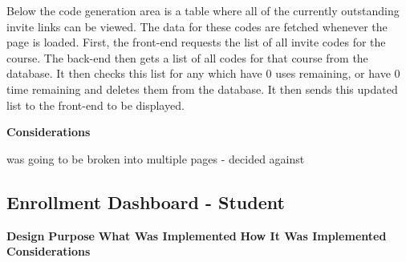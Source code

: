 Below the code generation area is a table where all of the currently outstanding invite links can be viewed. The data for these codes are fetched whenever the page is loaded. First, the front-end requests the list of all invite codes for the course. The back-end then gets a list of all codes for that course from the database. It then checks this list for any which have 0 uses remaining, or have 0 time remaining and deletes them from the database. It then sends this updated list to the front-end to be displayed.

\textbf{Considerations}

was going to be broken into multiple pages - decided against

\subsection{Enrollment Dashboard - Student}

\textbf{Design}
\textbf{Purpose}
\textbf{What Was Implemented}
\textbf{How It Was Implemented}
\textbf{Considerations}